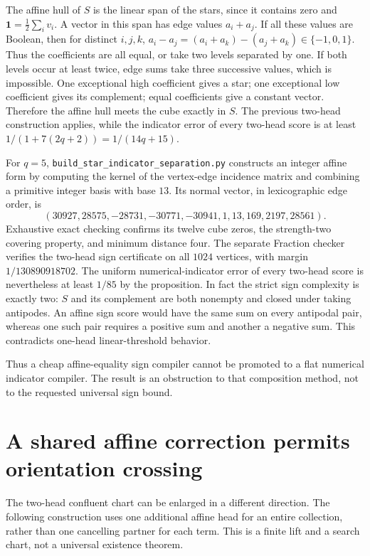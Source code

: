 \documentclass[11pt]{article}
\begin{document}
The affine hull of $S$ is the linear span of the stars, since it
contains zero and $\mathbf1=\tfrac12\sum_i v_i$. A vector in
this span has edge values $a_i+a_j$. If all these values are
Boolean, then for distinct $i,j,k$,
$a_i-a_j=(a_i+a_k)-(a_j+a_k)\in\{-1,0,1\}$.
Thus the coefficients are all equal, or take two levels separated
by one. If both levels occur at least twice, edge sums take three
successive values, which is impossible. One exceptional high
coefficient gives a star; one exceptional low coefficient gives
its complement; equal coefficients give a constant vector.
Therefore the affine hull meets the cube exactly in $S$.
The previous two-head construction applies, while the indicator
error of every two-head score is at least
$1/(1+7(2q+2))=1/(14q+15)$.

For $q=5$, \texttt{build\_star\_indicator\_separation.py} constructs
an integer affine form by computing the kernel of the vertex-edge
incidence matrix and combining a primitive integer basis with base
$13$. Its normal vector, in lexicographic edge order, is
\[
 (30927,28575,-28731,-30771,-30941,1,13,169,2197,28561).
\]
Exhaustive exact checking confirms its twelve cube zeros, the
strength-two covering property, and minimum distance four.
The separate Fraction checker verifies the two-head sign certificate
on all $1024$ vertices, with margin
$1/130890918702$. The uniform numerical-indicator error of every
two-head score is nevertheless at least $1/85$ by the proposition.
In fact the strict sign complexity is exactly two: $S$ and its
complement are both nonempty and closed under taking antipodes.
An affine sign score would have the same sum on every antipodal
pair, whereas one such pair requires a positive sum and another a
negative sum. This contradicts one-head linear-threshold behavior.

Thus a cheap affine-equality sign compiler cannot be promoted to a
flat numerical indicator compiler. The result is an obstruction to
that composition method, not to the requested universal sign bound.

\section{A shared affine correction permits orientation crossing}

The two-head confluent chart can be enlarged in a different direction.
The following construction uses one additional affine head for an entire
collection, rather than one cancelling partner for each term. This is a
finite lift and a search chart, not a universal existence theorem.
\end{document}
